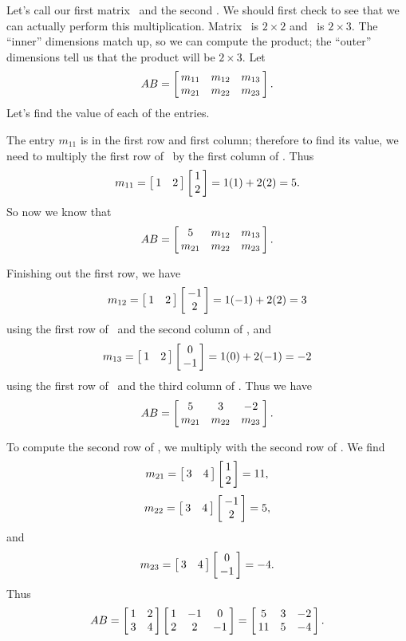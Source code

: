 {Let's call our first matrix \tta\ and the second \ttb. We should first check to see that we can actually perform this multiplication. Matrix \tta\ is $2\times 2$ and \ttb\ is $2\times 3$. The ``inner'' dimensions match up, so we can compute the product; the ``outer'' dimensions tell us that the product will be $2\times 3$. Let $$\tta\ttb = \bmx{ccc}m_{11} & m_{12} & m_{13}\\m_{21} & m_{22} & m_{23}\emx.$$ Let's find the value of each of the entries.

The entry $m_{11}$ is in the first row and first column; therefore to find its value, we need to multiply the first row of \tta\ by the first column of \ttb. Thus $$m_{11} = \bmx{cc} 1&2\emx\bmx{c}1\\2\emx = 1(1)+2(2) = 5.$$ So now we know that $$\tta\ttb = \bmx{ccc}5 & m_{12} & m_{13}\\m_{21} & m_{22} & m_{23}\emx.$$

Finishing out the first row, we have $$m_{12} = \bmx{cc}1&2\emx\bmx{c}-1\\2\emx = 1(-1)+2(2) = 3$$ using the first row of \tta\ and the second column of \ttb, and $$m_{13} = \bmx{cc}1&2\emx\bmx{c}0\\-1\emx = 1(0)+2(-1) = -2$$ using the first row of \tta\ and the third column of \ttb. Thus we have $$\tta\ttb = \bmx{ccc}5 & 3 & -2\\m_{21} & m_{22} & m_{23}\emx.$$

To compute the second row of \tta\ttb, we multiply with the second row of \tta. We find $$m_{21} = \bmx{cc}3&4\emx\bmx{c}1\\2\emx = 11,$$ $$m_{22} = \bmx{cc}3&4\emx\bmx{c}-1\\2\emx = 5,$$ and $$m_{23} = \bmx{cc}3&4\emx\bmx{c}0\\-1\emx = -4.$$ Thus $$\tta\ttb = \bmx{cc}1&2\\3&4\emx\bmx{ccc}1&-1&0\\2&2&-1\emx = \bmx{ccc}5 & 3 & -2\\11 & 5 & -4\emx.$$\ }\\ %



